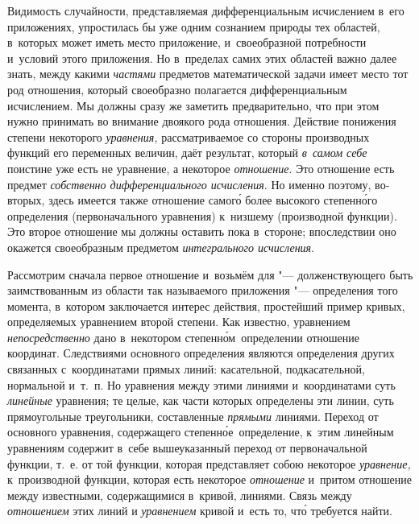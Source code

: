 Видимость случайности, представляемая дифференциальным исчислением в~его
приложениях, упростилась бы уже одним сознанием природы тех областей, в~которых
может иметь место приложение, и~своеобразной потребности и~условий этого
приложения. Но в~пределах самих этих областей важно далее знать, между какими
{\em частями} предметов математической задачи имеет место тот род отношения,
который своеобразно полагается дифференциальным исчислением. Мы должны сразу же
заметить предварительно, что при этом нужно принимать во внимание двоякого рода
отношения. Действие понижения степени некоторого {\em уравнения,}
рассматриваемое со стороны производных функций его переменных величин, даёт
результат, который {\em в~самом себе} поистине уже есть не уравнение,
а некоторое {\em отношение}. Это отношение есть предмет
{\em собственно дифференциального исчисления}. Но именно поэтому, во-вторых,
здесь имеется также отношение самог\'{о} более высокого степенн\'{о}го определения
(первоначального уравнения) к~низшему (производной функции). Это второе
отношение мы должны оставить пока в~стороне; впоследствии оно окажется
своеобразным предметом {\em интегрального исчисления}.

Рассмотрим сначала первое отношение и~возьмём для "--- долженствующего быть
заимствованным из области так называемого приложения "--- определения того
момента, в~котором заключается интерес действия, простейший пример кривых,
определяемых уравнением второй степени. Как известно, уравнением
{\em непосредственно} дано в~некотором степенн\'{о}м~определении отношение
координат. Следствиями основного определения являются определения других
связанных с~координатами прямых линий: касательной, подкасательной, нормальной
и~т.~п. Но уравнения между этими линиями и~координатами суть {\em линейные}
уравнения; те целые, как части которых определены эти линии, суть прямоугольные
треугольники, составленные {\em прямыми} линиями. Переход от основного
уравнения, содержащего степенн\'{о}е~определение, к~этим линейным уравнениям
содержит в~себе вышеуказанный переход от первоначальной функции, т.~е. от той
функции, которая представляет собою некоторое {\em уравнение,} к~производной
функции, которая есть некоторое {\em отношение} и~притом отношение между
известными, содержащимися в~кривой, линиями. Связь между {\em отношением} этих
линий и {\em уравнением} кривой и~есть то, чт\'{о} требуется найти.

